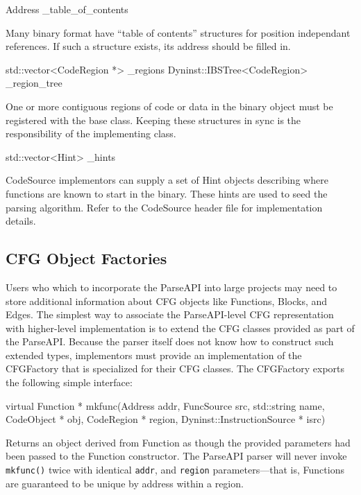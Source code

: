 \documentclass{article}
\newenvironment{apient}{\small\verbatim}{\endverbatim}
\newcommand{\apidesc}[1]{%
{\addtolength{\leftskip}{4em}%
#1\par\medskip}
}
\begin{document}
\begin{apient}
Address _table_of_contents
\end{apient}
\apidesc{Many binary format have ``table of contents'' structures for position
independant references. If such a structure exists, its address should be filled in.}

\begin{apient}
std::vector<CodeRegion *> _regions
Dyninst::IBSTree<CodeRegion> _region_tree
\end{apient}
\apidesc{One or more contiguous regions of code or data in the binary object must be registered with the base class. Keeping these structures in sync is the responsibility of the implementing class.}

\begin{apient}
std::vector<Hint> _hints
\end{apient}
\apidesc{CodeSource implementors can supply a set of Hint objects describing where functions are known to start in the binary. These hints are used to seed the parsing algorithm. Refer to the CodeSource header file for implementation details.}

\subsection{CFG Object Factories}
\label{sec:factories}

Users who which to incorporate the ParseAPI into large projects may need to store additional information about CFG objects like Functions, Blocks, and Edges. The simplest way to associate the ParseAPI-level CFG representation with higher-level implementation is to extend the CFG classes provided as part of the ParseAPI. Because the parser itself does not know how to construct such extended types, implementors must provide an implementation of the CFGFactory that is specialized for their CFG classes. The CFGFactory exports the following simple interface:

\begin{apient}
virtual Function * mkfunc(Address addr, 
    FuncSource src,
    std::string name, 
    CodeObject * obj, 
    CodeRegion * region,
    Dyninst::InstructionSource * isrc)
\end{apient}
\apidesc{Returns an object derived from Function as though the provided parameters had been passed to the Function constructor. The ParseAPI parser will never invoke \texttt{mkfunc()} twice with identical \texttt{addr}, and \texttt{region} parameters---that is, Functions are guaranteed to be unique by address within a region.}
\end{document}
